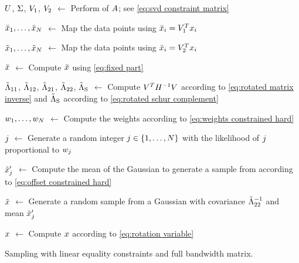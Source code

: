 \begin{algorithm}[t]
	
	$U$, $\Sigma$, $V_1$, $V_2$ $\gets$ Perform  of $A$; see \cref{eq:svd constraint matrix}
	
	$\breve{x}_{1},\ldots,\breve{x}_{N}$ $\gets$ Map the data points using $\breve{x}_{i} = V_1^T x_{i}$
		
	$\tilde{x}_{1},\ldots,\tilde{x}_{N}$ $\gets$ Map the data points using $\tilde{x}_{i} = V_2^T x_{i}$
	
	$\breve{x}$ $\gets$ Compute $\breve{x}$ using \cref{eq:fixed part}
	
	$\tilde{\Lambda}_{11}$, $\tilde{\Lambda}_{12}$, $\tilde{\Lambda}_{21}$, $\tilde{\Lambda}_{22}$, $\tilde{\Lambda}_{\mathrm{S}}$ $\gets$ Compute $V^T H^{-1} V$ according to \cref{eq:rotated matrix inverse} and $\tilde{\Lambda}_{\mathrm{S}}$ according to \cref{eq:rotated schur complement}
	
	$w_{1},\ldots,w_{N}$ $\gets$ Compute the weights according to \cref{eq:weights constrained hard}
	
	$j$ $\gets$ Generate a random integer $j\in\{1,\ldots,N\}$ with the likelihood of $j$ proportional to $w_{j}$
	
	$\tilde{x}_{j}'$ $\gets$ Compute the mean of the Gaussian to generate a sample from according to \cref{eq:offset constrained hard}
	
	$\tilde{x}$ $\gets$ Generate a random sample from a Gaussian with covariance $\tilde{\Lambda}_{22}^{-1}$ and mean $\tilde{x}_{j}'$
	
	$x$ $\gets$ Compute $x$ according to \cref{eq:rotation variable}
		
	\caption{Sampling with linear equality constraints and full bandwidth matrix.}
	\label{alg:constrained hard}
\end{algorithm}
